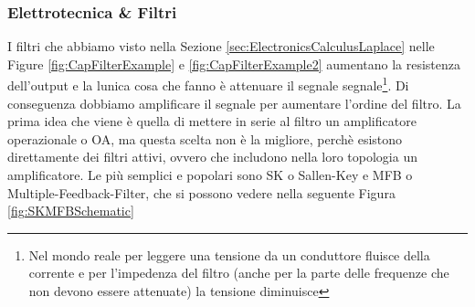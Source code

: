 \documentclass[a4paper, 10pt, final]{article} %
\begin{document}
    \subsubsection{Elettrotecnica \& Filtri}
    I filtri che abbiamo visto nella Sezione \ref{sec:ElectronicsCalculusLaplace} nelle Figure \ref{fig:CapFilterExample} e \ref{fig:CapFilterExample2} aumentano la resistenza dell'output e la lunica cosa che fanno \`{e} attenuare il segnale segnale\footnote{Nel mondo reale per leggere una tensione da un conduttore fluisce della corrente e per l'impedenza del filtro (anche per la parte delle frequenze che non devono essere attenuate) la tensione diminuisce}.
    Di conseguenza dobbiamo amplificare il segnale per aumentare l'ordine del filtro.
    La prima idea che viene \`{e} quella di mettere in serie al filtro un amplificatore operazionale o OA, ma questa scelta non \`{e} la migliore, perch\`{e} esistono direttamente dei filtri attivi, ovvero che includono nella loro topologia un amplificatore.
    Le pi\`{u} semplici e popolari sono SK o Sallen-Key e MFB o Multiple-Feedback-Filter, che si possono vedere nella seguente Figura \ref{fig:SKMFBSchematic}
\end{document}
